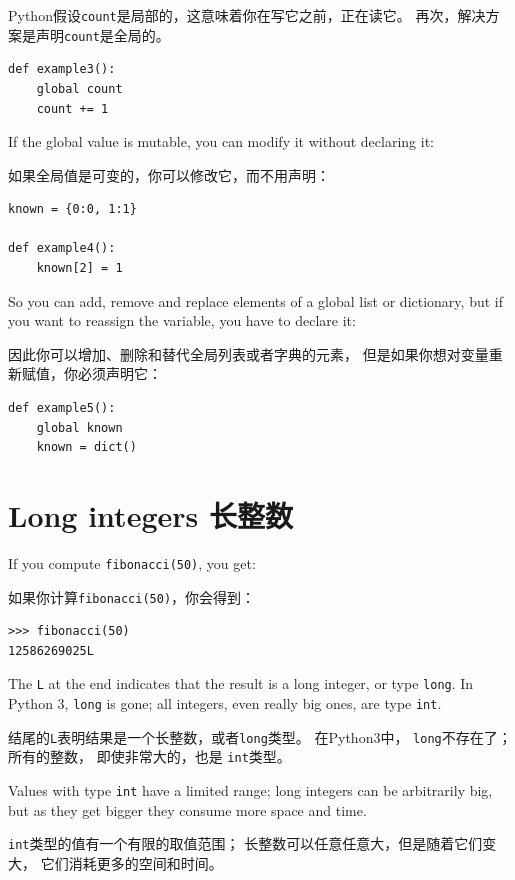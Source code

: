 \documentclass[10pt]{book}
\begin{document}
\begin{CJK}{UTF8}{gbsn}
Python假设{\tt count}是局部的，这意味着你在写它之前，正在读它。
再次，解决方案是声明{\tt count}是全局的。

\begin{verbatim}
def example3():
    global count
    count += 1
\end{verbatim}
%
If the global value is mutable, you can modify it without
declaring it:

如果全局值是可变的，你可以修改它，而不用声明：

\begin{verbatim}
known = {0:0, 1:1}

def example4():
    known[2] = 1
\end{verbatim}
%
So you can add, remove and replace elements of a global list or
dictionary, but if you want to reassign the variable, you
have to declare it:

因此你可以增加、删除和替代全局列表或者字典的元素，
但是如果你想对变量重新赋值，你必须声明它：

\begin{verbatim}
def example5():
    global known
    known = dict()
\end{verbatim}
%

\section{Long integers 长整数}

If you compute {\tt fibonacci(50)}, you get:

如果你计算{\tt fibonacci(50)}，你会得到：

\begin{verbatim}
>>> fibonacci(50)
12586269025L
\end{verbatim}
%
The {\tt L} at the end indicates that the result is a long
integer, or type {\tt long}.  In Python 3, {\tt long} is gone; all integers,
even really big ones, are type {\tt int}.

结尾的{\tt L}表明结果是一个长整数，或者{\tt long}类型。
在Python3中， {\tt long}不存在了；所有的整数，
即使非常大的，也是 {\tt int}类型。

Values with type {\tt int} have a limited range;
long integers can be arbitrarily big, but as they get bigger
they consume more space and time.

 {\tt int}类型的值有一个有限的取值范围；
 长整数可以任意任意大，但是随着它们变大，
 它们消耗更多的空间和时间。


\end{CJK}
\end{document}
